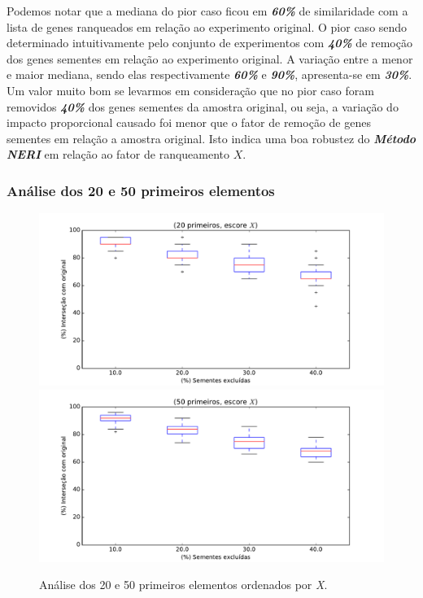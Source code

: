 Podemos notar que a mediana do pior caso ficou em \textbf{\textsl{60\%}} de similaridade com a lista de genes ranqueados em relação ao experimento original. O pior caso sendo determinado intuitivamente pelo conjunto de experimentos com  \textbf{\textsl{40\%}} de remoção dos genes sementes em relação ao experimento original. A variação entre a menor e maior mediana, sendo elas respectivamente \textbf{\textsl{60\%}} e \textbf{\textsl{90\%}}, apresenta-se em \textbf{\textsl{30\%}}. Um valor muito bom se levarmos em consideração que no pior caso foram removidos \textbf{\textsl{40\%}} dos genes sementes da amostra original, ou seja, a variação do impacto proporcional causado foi menor que o fator de remoção de genes sementes em relação a amostra original. Isto indica uma boa robustez do \textbf{\textsl{Método NERI}} em relação ao fator de ranqueamento $X$.  

\subsubsection{Análise dos 20 e 50 primeiros elementos}
%
\begin{figure}[ht!]
\includegraphics[width=1\textwidth]{Images/analyses/fig_X_20_40.pdf}
\includegraphics[width=1\textwidth]{Images/analyses/fig_X_50_40.pdf}
\caption {Análise dos 20 e 50 primeiros elementos ordenados por \textit{X}.
\label{fig_X_20-50_40}}
\end{figure}
%

